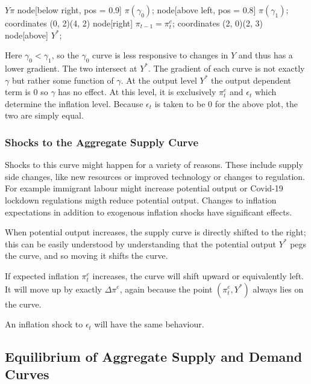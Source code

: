\documentclass[12pt]{report}
\begin{document}
\begin{flushleft}
\begin{econplot}{\(Y\)}{\(\pi\)}
    node[below right, pos = 0.9] {\(\pi(\gamma_0)\)};
    node[above left, pos = 0.8] {\(\pi(\gamma_1)\)};
     coordinates {(0, 2)(4, 2)}
    node[right] {\(\pi_{t - 1} = \pi^e_t\)};
     coordinates {(2, 0)(2, 3)}
    node[above] {\(Y^*\)};
\end{econplot}

Here \(\gamma_0 < \gamma_1\), so the \(\gamma_0\) curve is less responsive to
changes in \(Y\) and thus has a lower gradient. The two intersect at \(Y^*\).
The gradient of each curve is not exactly \(\gamma\) but rather some function
of \(\gamma\). At the output level \(Y^*\) the output dependent term is \(0\)
so \(\gamma\) has no effect. At this level, it is exclusively \(\pi^e_t\) and
\(\epsilon_t\) which determine the inflation level. Because \(\epsilon_t\) is
taken to be \(0\) for the above plot, the two are simply equal.

\subsubsection*{Shocks to the Aggregate Supply Curve}

Shocks to this curve might happen for a variety of reasons. These include
supply side changes, like new resources or improved technology or changes to
regulation. For example immigrant labour might increase potential output or 
Covid-19 lockdown regulations migth reduce potential output. Changes to
inflation expectations in addition to exogenous inflation shocks have
significant effects. \par
When potential output increases, the supply curve is directly shifted to the
right; this can be easily understood by understanding that the potential output
\(Y^*\) pegs the curve, and so moving it shifts the curve. \par
If expected inflation \(\pi^e_t\) increases, the curve will shift upward or
equivalently left. It will move up by exactly \(\Delta\pi^e\), again because
the point \((\pi^e_t, Y^*)\) always lies on the curve. \par
An inflation shock to \(\epsilon_t\) will have the same behaviour.

\subsection*{Equilibrium of Aggregate Supply and Demand Curves}


\end{flushleft}
\end{document}
